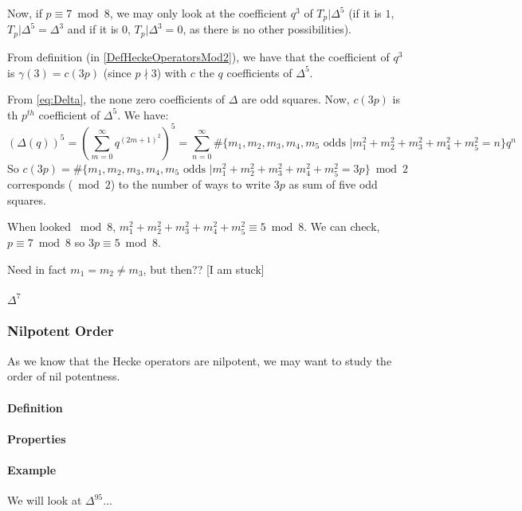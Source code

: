 Now, if $p \equiv 7 \bmod 8$, we may only look at the coefficient $q^3$ of $T_p|\Delta^5$ (if it is $1$, $T_p|\Delta^5 = \Delta^3$ and if it is $0$, $T_p|\Delta^3 = 0$, as there is no other possibilities).

From definition (in \ref{DefHeckeOperatorsMod2}), we have that the coefficient of $q^3$ is $\gamma(3) = c(3p)$ (since $p \nmid 3$) with $c$ the $q$ coefficients of $\Delta^5$.

From \eqref{eq:Delta}, the none zero coefficients of $\Delta$ are odd squares.
Now, $c(3p)$ is th $p^{th}$ coefficient of $\Delta^5$. We have:
$$
\left( \Delta(q) \right)^5
= \left( \sum_{m=0}^{\infty} q^{(2m+1)^2} \right)^5
= \sum_{n=0}^{\infty} \#\{m_1, m_2, m_3, m_4, m_5 \text{ odds } | m_1^2 + m_2^2 + m_3^2 + m_4^2 + m_5^2 = n\} q^n
$$
So $c(3p) = \#\{m_1, m_2, m_3, m_4, m_5 \text{ odds } | m_1^2 + m_2^2 + m_3^2 + m_4^2 + m_5^2 = 3p\} \bmod 2$ corresponds ($\bmod 2$) to the number of ways to write $3p$ as sum of five odd squares.

When looked $\bmod 8$, $m_1^2 + m_2^2 + m_3^2 + m_4^2 + m_5^2 \equiv 5 \bmod 8$.
We can check, $p \equiv 7 \bmod 8$ so $3p \equiv 5 \bmod 8$.







Need in fact $m_1 = m_2 \neq m_3$, but then??
[I am stuck]






\paragraph{$\Delta^7$}

\subsubsection{Nilpotent Order}
As we know that the Hecke operators are nilpotent, we may want to study the order of nil potentness.
\paragraph{Definition}

\paragraph{Properties}

\paragraph{Example}
We will look at $\Delta^{95}$...


